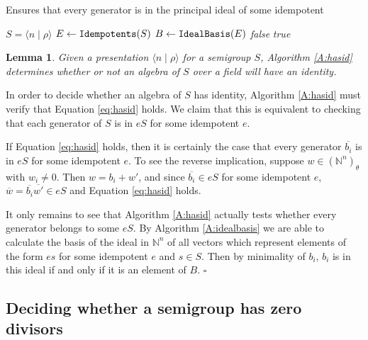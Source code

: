 \documentclass[12pt]{article}
\def\N{{\mathbb{N}}}
\newtheorem{lemma}{\bf Lemma}
\newenvironment{proof}{{\it Proof.\/}}{$\square$\\}
\begin{document}
\begin{algorithm}
\caption{Ensures that every generator is in the principal 
ideal of some idempotent}
\label{A:hasid}
\begin{algorithmic}[1]
\REQUIRE $S = \langle n \mid \rho\rangle$ 
\STATE $E \leftarrow {\mbox{\tt Idempotents}}(S)$ \label{l:calcidemps} 
\STATE $B \leftarrow {\mbox{\tt IdealBasis}}(E)$ \label{l:unionbasis}
 \emph{false}
\ELSE
{} \emph{true}
\ENDIF
\end{algorithmic}
\end{algorithm}

\begin{lemma}\label{L:hasid}
Given a presentation $\langle n \mid \rho\rangle$ for a semigroup 
$S$, Algorithm \ref{A:hasid} determines whether or not
an algebra of $S$ over a field will have an identity.
\end{lemma}

\begin{proof}
In order to decide whether an algebra of $S$ has identity,
Algorithm \ref{A:hasid}
must verify that Equation \ref{eq:hasid} holds. 
We claim that this is equivalent to checking that 
each generator of $S$ is in $eS$ for some idempotent $e$.

If Equation \ref{eq:hasid} holds, then it is certainly the case
that every generator $\overline{b_i}$ is in $eS$ for some 
idempotent $e$. To see the
reverse implication,  suppose $w \in (\mathbb{N}^n)_\theta$ with
$w_i \neq 0$. Then $w = b_i + w'$, and since $\overline{b_i} \in eS$ for some
idempotent $e$, $\overline{w} = \overline{b_i}\overline{w'} \in eS$
and Equation  \ref{eq:hasid} holds.

It only remains to see that Algorithm \ref{A:hasid} actually tests
whether every generator belongs to some $eS$. By Algorithm \ref{A:idealbasis}
we are able to calculate the basis of the ideal in $\N^n$ of  all
vectors which represent elements of the form $es$ for some idempotent
$e$ and $s \in S$. Then by minimality of $b_i$, $b_i$ is in this ideal
if and only if it is an element of $B$.  
\end{proof}

\subsection{Deciding whether a semigroup has zero divisors}\label{s:zerodiv}
\end{document}
